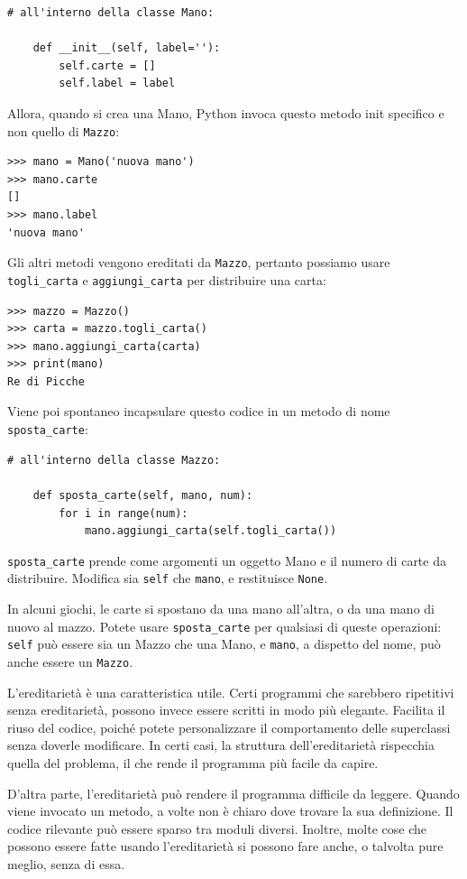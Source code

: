 \documentclass[10pt]{book}
\begin{document}
\begin{verbatim}
# all'interno della classe Mano:

    def __init__(self, label=''):
        self.carte = []
        self.label = label
\end{verbatim}
%
Allora, quando si crea una Mano, Python invoca questo metodo init specifico e non quello di {\tt Mazzo}:

\begin{verbatim}
>>> mano = Mano('nuova mano')
>>> mano.carte
[]
>>> mano.label
'nuova mano'
\end{verbatim}
%
Gli altri metodi vengono ereditati da {\tt Mazzo}, pertanto possiamo usare \verb"togli_carta" e \verb"aggiungi_carta" per distribuire una carta:

\begin{verbatim}
>>> mazzo = Mazzo()
>>> carta = mazzo.togli_carta()
>>> mano.aggiungi_carta(carta)
>>> print(mano)
Re di Picche
\end{verbatim}
%
Viene poi spontaneo incapsulare questo codice in un metodo di nome \verb"sposta_carte":

\begin{verbatim}
# all'interno della classe Mazzo:

    def sposta_carte(self, mano, num):
        for i in range(num):
            mano.aggiungi_carta(self.togli_carta())
\end{verbatim}
%
\verb"sposta_carte" prende come argomenti un oggetto Mano e il numero di carte da distribuire. Modifica sia {\tt self} che {\tt mano}, e restituisce {\tt None}.

In alcuni giochi, le carte si spostano da una mano all'altra, o da una mano di nuovo al mazzo. Potete usare \verb"sposta_carte" per qualsiasi di queste operazioni: {\tt self} può essere sia un Mazzo che una Mano, e {\tt mano}, a dispetto del nome, può anche essere un {\tt Mazzo}.

L'ereditarietà è una caratteristica utile. Certi programmi che sarebbero ripetitivi senza ereditarietà, possono invece essere scritti in modo più elegante. Facilita il riuso del codice, poiché potete personalizzare il comportamento delle superclassi senza doverle modificare. In certi casi, la struttura dell'ereditarietà rispecchia quella del problema, il che rende il programma più facile da capire.

D'altra parte, l'ereditarietà può rendere il programma difficile da leggere. Quando viene invocato un metodo, a volte non è chiaro dove trovare la sua definizione. Il codice rilevante può essere sparso tra moduli diversi. Inoltre, molte cose che possono essere fatte usando l'ereditarietà si possono fare anche, o talvolta pure meglio, senza di essa. 
\end{document}
